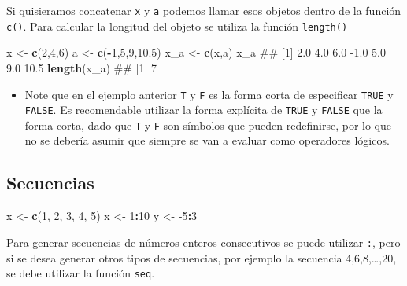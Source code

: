 \documentclass[]{book}
\newenvironment{Shaded}{\begin{snugshade}}{\end{snugshade}}
\newcommand{\KeywordTok}[1]{\textcolor[rgb]{0.13,0.29,0.53}{\textbf{#1}}}
\newcommand{\DecValTok}[1]{\textcolor[rgb]{0.00,0.00,0.81}{#1}}
\newcommand{\FloatTok}[1]{\textcolor[rgb]{0.00,0.00,0.81}{#1}}
\newcommand{\StringTok}[1]{\textcolor[rgb]{0.31,0.60,0.02}{#1}}
\newcommand{\OperatorTok}[1]{\textcolor[rgb]{0.81,0.36,0.00}{\textbf{#1}}}
\newcommand{\NormalTok}[1]{#1}
\newenvironment{rmdblock}[1]
{\begin{shaded*}
		\begin{itemize}
			\renewcommand{\labelitemi}{
				\raisebox{-.7\height}[0pt][0pt]{
					{\setkeys{Gin}{width=3em,keepaspectratio}\texttt{[image: images/\#1]}}
				}
			}
			\item
		}
		{
		\end{itemize}
	\end{shaded*}
}
\newenvironment{rmdnote}
{\begin{rmdblock}{note}}
	{\end{rmdblock}}
\begin{document}
Si quisieramos concatenar \texttt{x} y \texttt{a} podemos llamar esos
objetos dentro de la función \texttt{c()}. Para calcular la longitud del
objeto se utiliza la función \texttt{length()}

\begin{Shaded}
\begin{Highlighting}[]
\NormalTok{x <-}\StringTok{ }\KeywordTok{c}\NormalTok{(}\DecValTok{2}\NormalTok{,}\DecValTok{4}\NormalTok{,}\DecValTok{6}\NormalTok{)             }
\NormalTok{a <-}\StringTok{ }\KeywordTok{c}\NormalTok{(}\OperatorTok{-}\DecValTok{1}\NormalTok{,}\DecValTok{5}\NormalTok{,}\DecValTok{9}\NormalTok{,}\FloatTok{10.5}\NormalTok{)       }
\NormalTok{x_a <-}\StringTok{ }\KeywordTok{c}\NormalTok{(x,a)}
\NormalTok{x_a}
\NormalTok{## [1]  2.0  4.0  6.0 -1.0  5.0  9.0 10.5}
\KeywordTok{length}\NormalTok{(x_a)}
\NormalTok{## [1] 7}
\end{Highlighting}
\end{Shaded}

\begin{rmdnote}
Note que en el ejemplo anterior \texttt{T} y \texttt{F} es la forma
corta de especificar \texttt{TRUE} y \texttt{FALSE}. Es recomendable
utilizar la forma explícita de \texttt{TRUE} y \texttt{FALSE} que la
forma corta, dado que \texttt{T} y \texttt{F} son símbolos que pueden
redefinirse, por lo que no se debería asumir que siempre se van a
evaluar como operadores lógicos.
\end{rmdnote}

\hypertarget{secuencias}{%
\subsection{Secuencias}\label{secuencias}}

\begin{Shaded}
\begin{Highlighting}[]
\NormalTok{x <-}\StringTok{ }\KeywordTok{c}\NormalTok{(}\DecValTok{1}\NormalTok{, }\DecValTok{2}\NormalTok{, }\DecValTok{3}\NormalTok{, }\DecValTok{4}\NormalTok{, }\DecValTok{5}\NormalTok{) }
\NormalTok{x <-}\StringTok{ }\DecValTok{1}\OperatorTok{:}\DecValTok{10}
\NormalTok{y <-}\StringTok{ }\DecValTok{-5}\OperatorTok{:}\DecValTok{3}
\end{Highlighting}
\end{Shaded}

Para generar secuencias de números enteros consecutivos se puede
utilizar \texttt{:}, pero si se desea generar otros tipos de secuencias,
por ejemplo la secuencia 4,6,8,\ldots{},20, se debe utilizar la función
\texttt{seq}.
\end{document}
